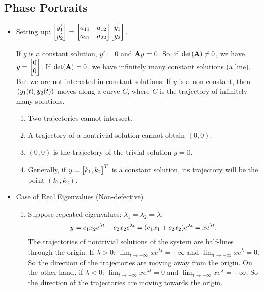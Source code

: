 \documentclass[12pt, a4paper]{article}
\def\dsst{\displaystyle}
\def\A{\vb A}
\begin{document}
\subsection{Phase Portraits}
\begin{itemize}
	\item Setting up: $\mqty[y_1'\\y_2']=\mqty[a_{11}&a_{12}\\a_{21}&a_{22}]\mqty[y_1\\y_2]$.\par If $y$ is a constant solution, $y'=0$ and $\A y=0$. So, if $\det(\A)\neq0$, we have $y=\mqty[0\\0]$. If $\det(\A)=0$, we have infinitely many constant solutions (a line). But we are not interested in constant solutions. If $y$ is a non-constant, then $\qty(y_1(t),y_2(t))$ moves along a curve $C$, where $C$ is the trajectory of infinitely many solutions. 
	\begin{enumerate}
		\item Two trajectories cannot intersect.
		\item A trajectory of a nontrivial solution cannot obtain $(0,0)$.
		\item $(0,0)$ is the trajectory of the trivial solution $y=0$.
		\item Generally, if $y=\mqty[k_1,k_2]^T$ is a constant solution, its trajectory will be the point $(k_1,k_2)$.
	\end{enumerate}
	\item Case of Real Eigenvalues (Non-defective)
	\begin{enumerate}
		\item Suppose repeated eigenvalues: $\lambda_1=\lambda_2=\lambda$: \[y=c_1x_2e^{\lambda t}+c_2x_2e^{\lambda t}=\qty(c_1x_1+c_2x_2)e^{\lambda t}=xe^{\lambda t}.\] The trajectories of nontrivial solutions of the system are half-lines through the origin. If $\lambda>0$: $\dsst\lim_{t\to+\infty}xe^{\lambda t}=+\infty$ and $\dsst\lim_{t\to-\infty}xe^{\lambda}=0$. So the direction of the trajectories are moving away from the origin. On the other hand, if $\lambda<0$: $\dsst\lim_{t\to+\infty}xe^{\lambda t}=0$ and $\dsst\lim_{t\to-\infty}xe^{\lambda}=-\infty$. So the direction of the trajectories are moving towards the origin.
		\begin{figure}[H]\centering

\end{figure}
\end{enumerate}
\end{itemize}
\end{document}
